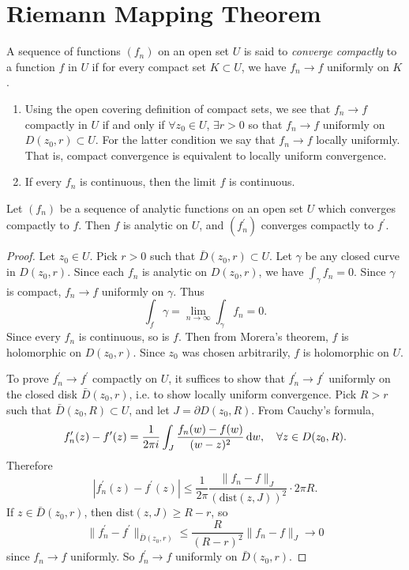 \section{Riemann Mapping Theorem}

\begin{defn}
A sequence of functions $(f_n)$ on an open set $U$ is said
to \emph{converge compactly} to a function $f$ in $U$ if
for every compact set $K \subset U$, we have
$f_n \to f$ uniformly on $K$.
\end{defn}

\begin{remark}
  \begin{enumerate}
    \item{
      Using the open covering definition of compact sets,
      we see that $f_n \to f$ compactly in $U$ if and only
      if $\forall z_0 \in U$, $\exists r > 0$ so that
      $f_n \to f$ uniformly on $D(z_0, r) \subset U$.
      For the latter condition we say that
      $f_n \to f$ locally uniformly. That is, compact
      convergence is equivalent to locally uniform convergence.
    }
    \item{
      If every $f_n$ is continuous, then the limit $f$ is
      continuous.
    }
  \end{enumerate}
\end{remark}

\begin{theorem}
Let $(f_n)$ be a sequence of analytic functions on an open set $U$
which converges compactly to $f$. Then $f$ is analytic on $U$, and
$(f_n^\prime)$ converges compactly to $f^\prime$.
\end{theorem}

\begin{proof}
Let $z_0 \in U$. Pick $r > 0$ such that $\bar{D}(z_0, r) \subset U$.
Let $\gamma$ be any closed curve in $D(z_0, r)$. Since each $f_n$ is
analytic on $D(z_0, r)$, we have $\int_\gamma f_n = 0$. Since
$\gamma$ is compact, $f_n \to f$ uniformly on $\gamma$. Thus
$$
  \int_f \gamma
= \lim_{n \to \infty} \int_\gamma f_n
= 0.
$$
Since every $f_n$ is continuous, so is $f$. Then from Morera's
theorem, $f$ is holomorphic on $D(z_0, r)$. Since $z_0$ was chosen
arbitrarily, $f$ is holomorphic on $U$.

To prove $f_n^\prime \to f^\prime$ compactly on $U$, it suffices to
show that $f_n^\prime \to f^\prime$ uniformly on the closed disk
$\bar{D}(z_0, r)$, i.e. to show locally uniform convergence.
Pick $R > r$ such that $\bar{D}(z_0, R) \subset U$, and let
$J = \partial D(z_0, R)$. From Cauchy's formula,
$$
  f_n^\prime(z) - f^\prime(z)
= \frac{1}{2 \pi i}
  \int_J
    \frac{f_n(w) - f(w)}
         {(w - z)^2}
    \mathop{}\!\mathrm{d} w, \quad
\forall z \in D(z_0, R).
$$
Therefore
$$
     |f_n^\prime(z) - f^\prime(z)|
\leq \frac{1}{2 \pi}
     \frac{\| f_n - f \|_J}
          {(\mathrm{dist}(z, J))^2}
     \cdot 2 \pi R.
$$
If $z \in \bar{D}(z_0, r)$, then
$\mathrm{dist}(z, J) \geq R - r$, so
$$
     \|f_n^\prime - f^\prime\|_{\bar{D}(z_0, r)}
\leq \frac{R}{(R - r)^2}
     \|f_n - f\|_J
\to 0
$$
since $f_n \to f$ uniformly. So
$f_n^\prime \to f$ uniformly on $\bar{D}(z_0, r)$.
\end{proof}

